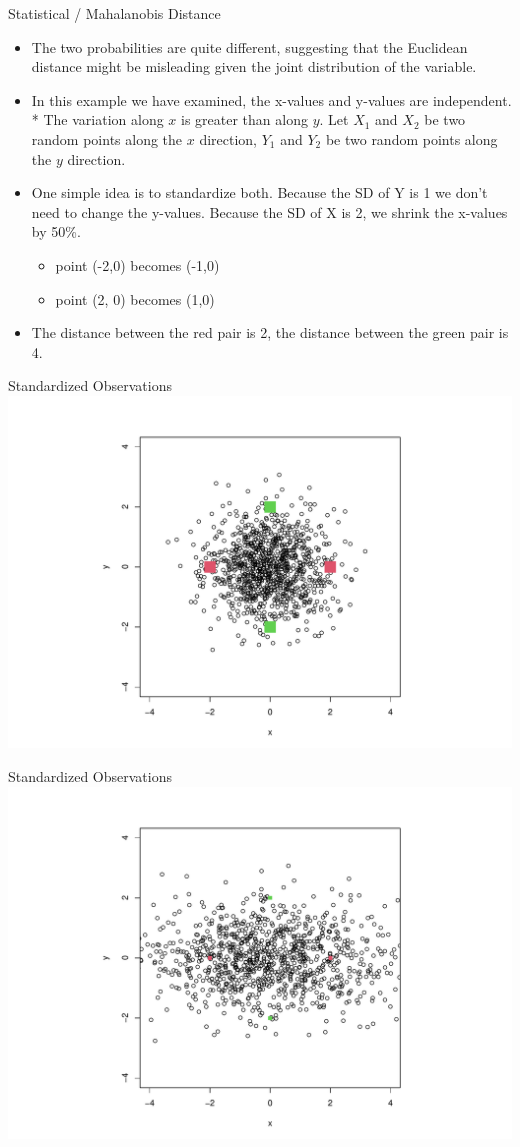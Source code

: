 \documentclass[
  ignorenonframetext,
]{beamer}
\providecommand{\tightlist}{%
  \setlength{\itemsep}{0pt}\setlength{\parskip}{0pt}}
\begin{document}
\begin{frame}{Statistical / Mahalanobis Distance}
\protect\hypertarget{statistical-mahalanobis-distance}{}
\begin{itemize}
\tightlist
\item
  The two probabilities are quite different, suggesting that the
  Euclidean distance might be misleading given the joint distribution of
  the variable.
\item
  In this example we have examined, the x-values and y-values are
  independent. * The variation along \(x\) is greater than along \(y\).
  Let \(X_1\) and \(X_2\) be two random points along the \(x\)
  direction, \(Y_1\) and \(Y_2\) be two random points along the \(y\)
  direction.\\
\item
  One simple idea is to standardize both. Because the SD of Y is 1 we
  don't need to change the y-values. Because the SD of X is 2, we shrink
  the x-values by 50\%.

  \begin{itemize}
  \tightlist
  \item
    point (-2,0) becomes (-1,0)
  \item
    point (2, 0) becomes (1,0)
  \end{itemize}
\item
  The distance between the red pair is 2, the distance between the green
  pair is 4.
\end{itemize}
\end{frame}

\begin{frame}{Standardized Observations}
\protect\hypertarget{standardized-observations}{}
\includegraphics[width=0.6\linewidth]{Introduction_files/figure-beamer/unnamed-chunk-23-1}
\end{frame}

\begin{frame}{Standardized Observations}
\protect\hypertarget{standardized-observations-1}{}
\includegraphics[width=0.6\linewidth]{Introduction_files/figure-beamer/unnamed-chunk-24-1}
\end{frame}
\end{document}
